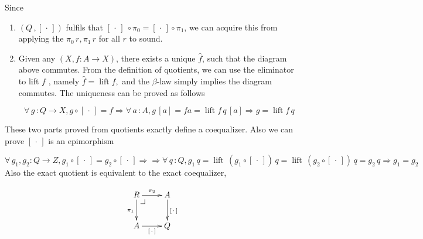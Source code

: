 \documentclass[envcountsame]{llncs}
\makeatletter
\newcommand{\dotph}{\,\cdot\,}
\providecommand{\class}[1]{[#1]}
\DeclareMathOperator{\lift}{lift}
\newcommand{\pullbackcorner}[1][dr]{\save*!/#1-1.2pc/#1:(-1,1)@^{|-}\restore}
\makeatother
\begin{document}
Since 
\begin{enumerate}
\item$(Q \,, \class\dotph)$ fulfils that $\class\dotph\ \circ \pi_0 = \class\dotph \circ \pi_1$, we can acquire this from applying the $\pi_{0}\, r ,\pi_{1}\,r$ for all $r $ to sound.
\item Given any $(X, f \colon A \to X)$, there exists a unique $\hat{f}$, such that the diagram above commutes. From the definition of quotients, we can use the eliminator to lift $f$ , namely $\hat{f} = \lift f,  $ and the $\beta$-law simply implies the diagram commutes. The uniqueness can be proved as follows

\[\forall \,g \, \colon Q \to X, g \circ \class\dotph = f \Rightarrow \forall \,a \,\colon A, g \,\class a = f a = \lift f \,q \,\class a  \Rightarrow g = \lift f \,q\]

\end{enumerate}

These two parts proved from quotients
exactly define a coequalizer. Also we can prove $\class\dotph$ is an epimorphism

\[ \forall\, g_1,g_2 : Q \to Z, g_1 \circ \class\dotph = g_2 \circ \class\dotph \Rightarrow  

\Rightarrow  \forall \,q \,\colon Q,  g_{1} \,q = \lift \, (g_1 \circ \class\dotph) \, q = \lift \, (g_2 \circ \class\dotph) \, q = g_2\, q \Rightarrow g_1 = g_2

\]
Also the exact quotient is equivalent to the exact coequalizer,

\[\xymatrix{
R\pullbackcorner\ar[r]^{\pi_2}\ar[d]_{\pi_1} & A\ar[d]^{\class\dotph} \\
A\ar[r]_{\class\dotph} & Q
}\]
\end{document}
